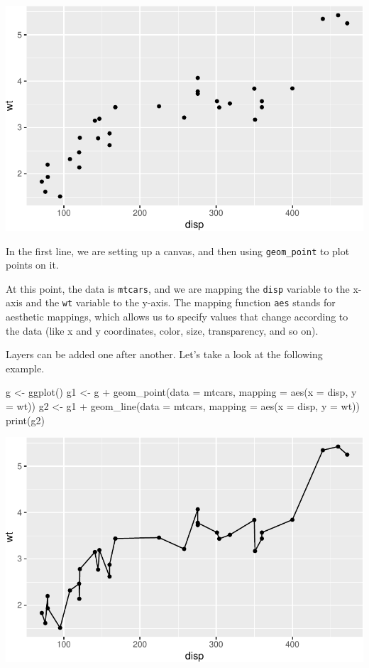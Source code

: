 \documentclass[
  a4paper,
]{book}
\newenvironment{Shaded}{\begin{snugshade}}{\end{snugshade}}
\newcommand{\AttributeTok}[1]{\textcolor[rgb]{0.40,0.45,0.13}{#1}}
\newcommand{\FunctionTok}[1]{\textcolor[rgb]{0.28,0.35,0.67}{#1}}
\newcommand{\NormalTok}[1]{\textcolor[rgb]{0.00,0.23,0.31}{#1}}
\newcommand{\OtherTok}[1]{\textcolor[rgb]{0.00,0.23,0.31}{#1}}
\newcommand{\SpecialCharTok}[1]{\textcolor[rgb]{0.37,0.37,0.37}{#1}}
\begin{document}
\includegraphics{chapter04_files/figure-pdf/geom_exam-1.pdf}

In the first line, we are setting up a canvas, and then using
\texttt{geom\_point} to plot points on it.

At this point, the data is \texttt{mtcars}, and we are mapping the
\texttt{disp} variable to the x-axis and the \texttt{wt} variable to the
y-axis. The mapping function \texttt{aes} stands for aesthetic mappings,
which allows us to specify values that change according to the data
(like x and y coordinates, color, size, transparency, and so on).

Layers can be added one after another. Let's take a look at the
following example.

\begin{Shaded}
\begin{Highlighting}[]
\NormalTok{g }\OtherTok{\textless{}{-}} \FunctionTok{ggplot}\NormalTok{()}
\NormalTok{g1 }\OtherTok{\textless{}{-}}\NormalTok{ g }\SpecialCharTok{+} \FunctionTok{geom\_point}\NormalTok{(}\AttributeTok{data =}\NormalTok{ mtcars, }\AttributeTok{mapping =} \FunctionTok{aes}\NormalTok{(}\AttributeTok{x =}\NormalTok{ disp, }\AttributeTok{y =}\NormalTok{ wt))}
\NormalTok{g2 }\OtherTok{\textless{}{-}}\NormalTok{ g1 }\SpecialCharTok{+} \FunctionTok{geom\_line}\NormalTok{(}\AttributeTok{data =}\NormalTok{ mtcars, }\AttributeTok{mapping =} \FunctionTok{aes}\NormalTok{(}\AttributeTok{x =}\NormalTok{ disp, }\AttributeTok{y =}\NormalTok{ wt))}
\FunctionTok{print}\NormalTok{(g2)}
\end{Highlighting}
\end{Shaded}

\includegraphics{chapter04_files/figure-pdf/geom_overlay-1.pdf}
\end{document}
